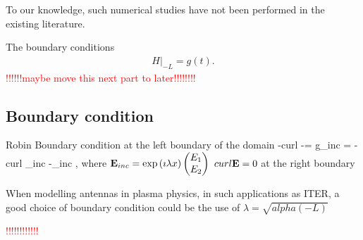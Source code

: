 To our knowledge, such numerical studies have not been performed in the existing literature. 





The boundary conditions
\begin{align*}
H|_{-L}=g(t).
\end{align*}
\textcolor{red}{!!!!!!maybe move this next part to later!!!!!!!!}
\subsection{Boundary condition}
Robin Boundary condition at the left boundary of the domain
\be
-curl \E -\imath \lambda\E \wedge \n = g_{inc} = -curl \E_{inc} -\imath \lambda\E_{inc} \wedge \n,
\ee
where ${\bf E}_{inc} = \exp \left(\imath \lambda x\right)\begin{pmatrix} E_1\\ E_2 \end{pmatrix}$
$curl {\bf E} = 0$ at the right boundary
\begin{remark}
	When modelling antennas in plasma physics, in such applications as ITER, a good choice of boundary condition could be the use of $\lambda = \sqrt{alpha(-L)}$
\end{remark}
\textcolor{red}{!!!!!!!!!!!!}